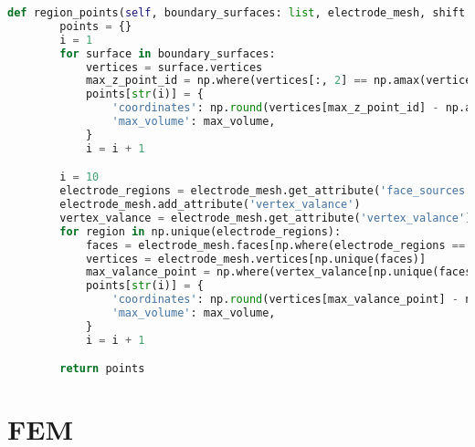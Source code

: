 \begin{lstlisting}[language=Python,caption={Class handling all mesh operations for the models},captionpos=b,label=lst:mesh_operations_class]
    def region_points(self, boundary_surfaces: list, electrode_mesh, shift: float, max_volume=30):
        points = {}
        i = 1
        for surface in boundary_surfaces:
            vertices = surface.vertices
            max_z_point_id = np.where(vertices[:, 2] == np.amax(vertices[:, 2]))[0][0]
            points[str(i)] = {
                'coordinates': np.round(vertices[max_z_point_id] - np.absolute(np.multiply(vertices[max_z_point_id]/np.linalg.norm(vertices[max_z_point_id]), [0, 0, shift])), 6),
                'max_volume': max_volume,
            }
            i = i + 1

        i = 10
        electrode_regions = electrode_mesh.get_attribute('face_sources')
        electrode_mesh.add_attribute('vertex_valance')
        vertex_valance = electrode_mesh.get_attribute('vertex_valance')
        for region in np.unique(electrode_regions):
            faces = electrode_mesh.faces[np.where(electrode_regions == region)[0]]
            vertices = electrode_mesh.vertices[np.unique(faces)]
            max_valance_point = np.where(vertex_valance[np.unique(faces)] == np.amax(vertex_valance[np.unique(faces)]))[0][0]
            points[str(i)] = {
                'coordinates': np.round(vertices[max_valance_point] - np.multiply(vertices[max_valance_point]/np.linalg.norm(vertices[max_valance_point]), shift), 6),
                'max_volume': max_volume,
            }
            i = i + 1

        return points
\end{lstlisting}

\section{FEM}

